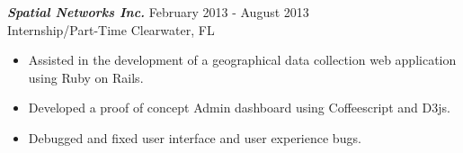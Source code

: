 {\sl \textbf{Spatial Networks Inc.}} \hfill February 2013 - August 2013 \\
Internship/Part-Time \hfill Clearwater, FL
\begin{itemize}
    \item Assisted in the development of a geographical data collection web application using Ruby on Rails.
    \item Developed a proof of concept Admin dashboard using Coffeescript and D3js.
    \item Debugged and fixed user interface and user experience bugs.
\end{itemize}
